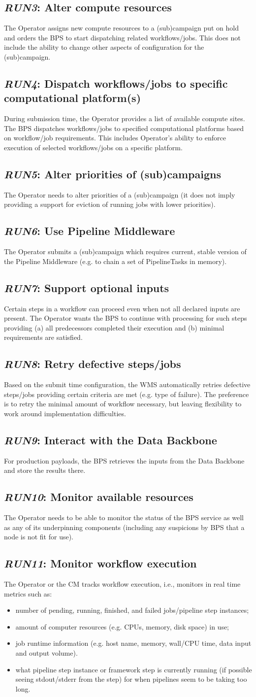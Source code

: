 \documentclass[DM,toc]{lsstdoc}
\newcommand{\usecase}[2]{\subsection{\emph{#1}: #2}\label{use:#1}}
\begin{document}
\usecase{RUN3}{Alter compute resources}
The Operator assigns new compute resources to a (sub)campaign put on
hold and orders the BPS to start dispatching related workflows/jobs.
This does not include the ability to change other aspects of
configuration for the (sub)campaign.

\usecase{RUN4}{Dispatch workflows/jobs to specific computational platform(s)}
During submission time, the Operator provides a list of available
compute sites.  The BPS dispatches workflows/jobs to specified
computational platforms based on workflow/job requirements.  This
includes Operator's ability to enforce execution of selected
workflows/jobs on a specific platform.

\usecase{RUN5}{Alter priorities of (sub)campaigns}
The Operator needs to alter priorities of a (sub)campaign (it does not imply
providing a support for eviction of running jobs with lower priorities).

\usecase{RUN6}{Use Pipeline Middleware}
The Operator submits a (sub)campaign which requires current, stable version of the Pipeline  Middleware (e.g.  to chain a set of PipelineTasks in memory).

\usecase{RUN7}{Support optional inputs}
Certain steps in a workflow can proceed even when not all declared inputs are
present.  The Operator wants the BPS to continue with processing for such steps
providing (a) all predecessors completed their execution and (b) minimal
requirements are satisfied.

\usecase{RUN8}{Retry defective steps/jobs}
Based on the submit time configuration, the WMS automatically retries defective
steps/jobs providing certain criteria are met (e.g. type of failure).  The
preference is to retry the minimal amount of workflow necessary, but leaving
flexibility to work around implementation difficulties.

\usecase{RUN9}{Interact with the Data Backbone}
For production payloads, the BPS retrieves the inputs from the Data Backbone
and store the results there.

\usecase{RUN10}{Monitor available resources}
The Operator needs to be able to monitor the status of the BPS service as well
as any of its underpinning components (including any suspicions by BPS that a
node is not fit for use).

\usecase{RUN11}{Monitor workflow execution}
The Operator or the CM tracks workflow execution, i.e., monitors in real time
metrics such as:
\begin{itemize}
  \item
    number of pending, running, finished, and failed jobs/pipeline step
    instances;
  \item
    amount of computer resources (e.g. CPUs, memory, disk space) in use;
  \item
    job runtime information (e.g. host name, memory, wall/CPU time, data input
    and output volume).
  \item
    what pipeline step instance or framework step is currently running (if
    possible seeing stdout/stderr from the step) for when pipelines seem to be
    taking too long.
\end{itemize}
\end{document}
